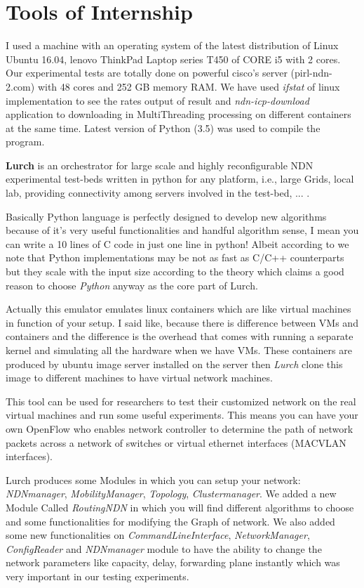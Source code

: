 \section{Tools of Internship}

I used a machine with an operating system of the latest distribution of Linux Ubuntu 16.04, lenovo ThinkPad Laptop series T450 of CORE i5 with 2 cores. Our experimental tests are totally done on powerful cisco's server (pirl-ndn-2.com) with 48 cores and 252 GB memory RAM. We have used \textit{ifstat} of linux implementation to see the rates output of result and \textit{ndn-icp-download} application to downloading in MultiThreading processing on different containers at the same time. Latest version of Python (3.5) was used to compile the program.

\textbf{\Huge{Lurch}} is an orchestrator for large scale and highly reconfigurable NDN experimental test-beds written in python for any platform, i.e., large Grids, local lab, providing connectivity among servers involved in the test-bed, ... .

Basically Python language is perfectly designed to develop new algorithms because of it's very useful functionalities and handful algorithm sense, I mean you can write a 10 lines of C code in just one line in python! Albeit according to \cite{python} we note that Python implementations may be not as fast as C/C++ counterparts but they scale with the input size according to the theory which claims a good reason to choose \textit{Python} anyway as the core part of Lurch.

Actually this emulator emulates linux containers which are like virtual machines in function of your setup. I said like, because there is difference between VMs and containers and the difference is the overhead that comes with running a separate kernel and simulating all the hardware when we have VMs. These containers are produced by ubuntu image server installed on the server then \textit{Lurch} clone this image to different machines to have virtual network machines. 

This tool can be used for researchers to test their customized network on the real virtual machines and run some useful experiments. This means you can have your own OpenFlow who enables network controller to determine the path of network packets across a network of switches or virtual ethernet interfaces (MACVLAN interfaces).

Lurch produces some Modules in which you can setup your network: \textit{NDNmanager}, \textit{MobilityManager}, \textit{Topology}, \textit{Clustermanager}. We added a new Module Called \textit{RoutingNDN} in which you will find different algorithms to choose and some functionalities for modifying the Graph of network.
We also added some new functionalities on \textit{CommandLineInterface}, \textit{NetworkManager}, \textit{ConfigReader} and \textit{NDNmanager} module to have the ability to change the network parameters like capacity, delay, forwarding plane instantly which was very important in our testing experiments.


